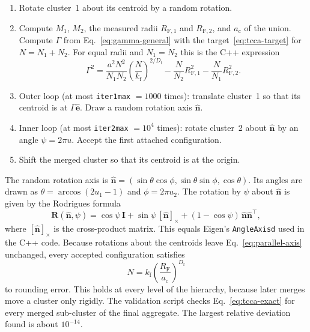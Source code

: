 \documentclass[11pt,a4paper]{article}
\newcommand{\Df}{D_\text{f}}
\newcommand{\kf}{k_\text{f}}
\newcommand{\RF}{R_\text{F}}
\begin{document}
\begin{enumerate}
  \item Rotate cluster~1 about its centroid by a random rotation.
  \item Compute $M_1$, $M_2$, the measured radii $R_{\text{F},1}$ and $R_{\text{F},2}$, and $a_\text{c}$ of the union.
        Compute $\Gamma$ from Eq.~\eqref{eq:gamma-general} with the target~\eqref{eq:tcca-target} for $N = N_1 + N_2$.
        For equal radii and $N_1 = N_2$ this is the C++ expression
        \begin{equation}
          \Gamma^2 = \frac{a^2 N^2}{N_1 N_2} \left( \frac{N}{\kf} \right)^{2/\Df}
                   - \frac{N}{N_2} R_{\text{F},1}^2
                   - \frac{N}{N_1} R_{\text{F},2}^2 .
          \label{eq:tcca-merge-mono}
        \end{equation}
  \item Outer loop (at most \texttt{iter1max} $= 1000$ times):
        translate cluster~1 so that its centroid is at $\Gamma \hat{\bm{e}}$.
        Draw a random rotation axis $\hat{\bm{n}}$.
  \item Inner loop (at most \texttt{iter2max} $= 10^4$ times):
        rotate cluster~2 about $\hat{\bm{n}}$ by an angle $\psi = 2\pi u$.
        Accept the first attached configuration.
  \item Shift the merged cluster so that its centroid is at the origin.
\end{enumerate}

The random rotation axis is $\hat{\bm{n}} = (\sin\theta\cos\phi, \sin\theta\sin\phi, \cos\theta)$.
Its angles are drawn as $\theta = \arccos(2u_1 - 1)$ and $\phi = 2\pi u_2$.
The rotation by $\psi$ about $\hat{\bm{n}}$ is given by the Rodrigues formula
\begin{equation}
  \mathbf{R}(\hat{\bm{n}}, \psi) = \cos\psi\,\mathbf{I}
    + \sin\psi\,[\hat{\bm{n}}]_\times
    + (1 - \cos\psi)\,\hat{\bm{n}}\hat{\bm{n}}^\top ,
  \label{eq:rodrigues}
\end{equation}
where $[\hat{\bm{n}}]_\times$ is the cross-product matrix.
This equals Eigen's \texttt{AngleAxisd} used in the C++ code.
Because rotations about the centroids leave Eq.~\eqref{eq:parallel-axis} unchanged, every accepted configuration satisfies
\begin{equation}
  N = \kf \left( \frac{\RF}{a_\text{c}} \right)^{\Df}
  \label{eq:tcca-exact}
\end{equation}
to rounding error.
This holds at every level of the hierarchy, because later merges move a cluster only rigidly.
The validation script checks Eq.~\eqref{eq:tcca-exact} for every merged sub-cluster of the final aggregate.
The largest relative deviation found is about $10^{-14}$.
\end{document}
